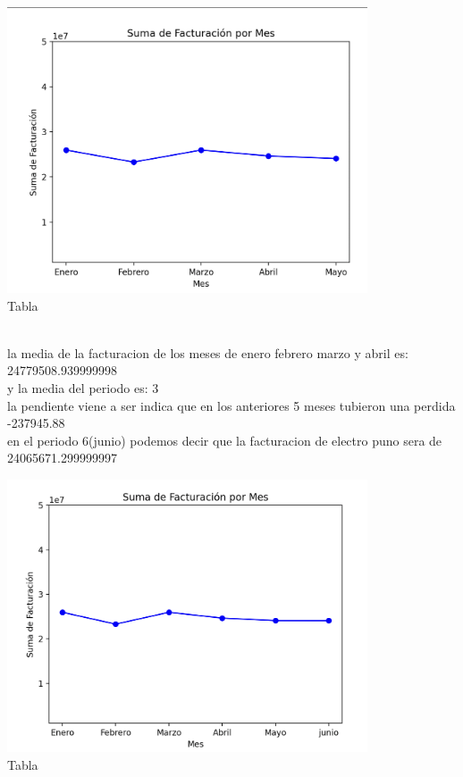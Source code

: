 \documentclass{article}
\begin{document}
  \begin{minipage}{\textwidth}
    \centering
    \includegraphics[width=0.8\textwidth]{./img/Captura de pantalla 2023-07-05 a la(s) 20.15.40.png}
    \\
    {Tabla}
    \label{fig:etiqueta}
  \end{minipage}
  \\
  
  la media de la facturacion de los meses de enero febrero marzo y abril es: 24779508.939999998
  \\

  y la media del periodo es: 3
  \\ 

  la pendiente viene a ser indica que en los anteriores 5 meses tubieron una perdida -237945.88
  \\

  en el periodo 6(junio) podemos decir que la facturacion de electro puno sera de 24065671.299999997
  \\
  
  \begin{minipage}{\textwidth}
    \centering
    \includegraphics[width=0.8\textwidth]{./img/Captura de pantalla 2023-07-05 a la(s) 20.21.24.png}
    \\
    {Tabla}
    \label{fig:etiqueta}
  \end{minipage}
\end{document}
